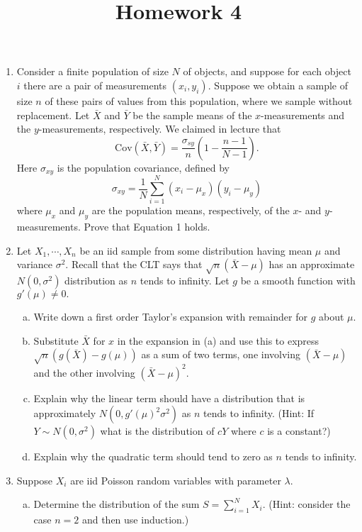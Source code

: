 \documentclass{article}
\newcommand{\cov}{\mathrm{Cov}}
\begin{document}
\title{Homework 4}
\maketitle
\thispagestyle{fancy}

\begin{enumerate}
	\item Consider a finite population of size $N$ of objects, and suppose for each object $i$ there are a pair of measurements $(x_i, y_i).$ Suppose we obtain a sample of size $n$ of these pairs of values from this population, where we sample without replacement. Let $\bar{X}$ and $\bar{Y}$ be the sample means of the $x$-measurements and the $y$-measurements, respectively. We claimed in lecture that \[\tag{1}\cov(\bar{X}, \bar{Y})=\frac{\sigma_{sy}}{n}\left( 1-\frac{n-1}{N-1} \right).\] Here $\sigma_{xy}$ is the population covariance, defined by \[\sigma_{xy}=\frac{1}{N}\sum_{i=1}^{N}(x_i-\mu_x)(y_i-\mu_y)\] where $\mu_x$ and $\mu_y$ are the population means, respectively, of the $x$- and $y$-measurements. Prove that Equation 1 holds.

	\item Let $X_1,\cdots, X_n$ be an iid sample from some distribution having mean $\mu$ and variance $\sigma^2.$ Recall that the CLT says that $\sqrt{n}(\bar{X}-\mu)$ has an approximate $N(0, \sigma^2)$ distribution as $n$ tends to infinity. Let $g$ be a smooth function with $g'(\mu)\neq 0.$ 
		\begin{enumerate}[(a)]
			\item Write down a first order Taylor's expansion with remainder for $g$ about $\mu.$

			\item Substitute $\bar{X}$ for $x$ in the expansion in (a) and use this to express $\sqrt{n}(g(\bar{X})-g(\mu))$ as a sum of two terms, one involving $(\bar{X}-\mu)$ and the other involving $(\bar{X}-\mu)^2.$

			\item Explain why the linear term should have a distribution that is approximately $N(0, g'(\mu)^2\sigma^2)$ as $n$ tends to infinity. (Hint: If $Y\sim N(0, \sigma^2)$ what is the distribution of $cY$ where $c$ is a constant?)

			\item Explain why the quadratic term should tend to zero as $n$ tends to infinity.
				
		\end{enumerate}

	\item Suppose $X_i$ are iid Poisson random variables with parameter $\lambda.$
		\begin{enumerate}[(a)]
			\item Determine the distribution of the sum $S=\displaystyle\sum_{i=1}^{N}X_i.$ (Hint: consider the case $n=2$ and then use induction.)


\end{enumerate}
\end{enumerate}
\end{document}
